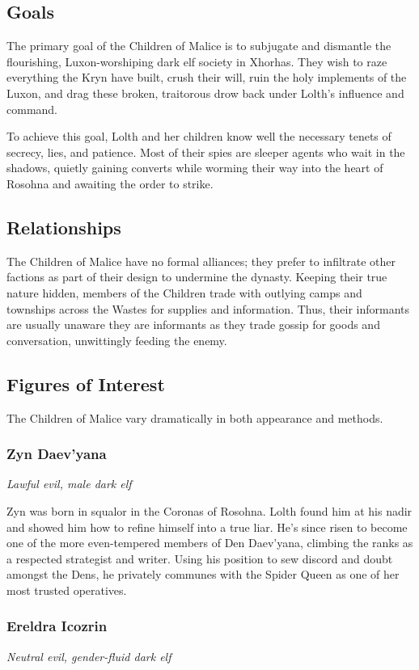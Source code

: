 \documentclass[10pt,a4paper,twoside,bg=print,twocolumn,openany,nodeprecatedcode]{dndbook}
\begin{document}
\subsection{Goals}
The primary goal of the Children of Malice is to subjugate and dismantle the flourishing, Luxon-worshiping dark elf society in Xhorhas. They wish to raze everything the Kryn have built, crush their will, ruin the holy implements of the Luxon, and drag these broken, traitorous drow back under Lolth's influence and command.

To achieve this goal, Lolth and her children know well the necessary tenets of secrecy, lies, and patience. Most of their spies are sleeper agents who wait in the shadows, quietly gaining converts while worming their way into the heart of Rosohna and awaiting the order to strike.

\subsection{Relationships}
The Children of Malice have no formal alliances; they prefer to infiltrate other factions as part of their design to undermine the dynasty. Keeping their true nature hidden, members of the Children trade with outlying camps and townships across the Wastes for supplies and information. Thus, their informants are usually unaware they are informants as they trade gossip for goods and conversation, unwittingly feeding the enemy.

\subsection{Figures of Interest}
The Children of Malice vary dramatically in both appearance and methods.

\subsubsection{Zyn Daev'yana}
\textit{Lawful evil, male dark elf}

Zyn was born in squalor in the Coronas of Rosohna. Lolth found him at his nadir and showed him how to refine himself into a true liar. He's since risen to become one of the more even-tempered members of Den Daev'yana, climbing the ranks as a respected strategist and writer. Using his position to sew discord and doubt amongst the Dens, he privately communes with the Spider Queen as one of her most trusted operatives.

\subsubsection{Ereldra Icozrin}
\textit{Neutral evil, gender-fluid dark elf}
\end{document}
